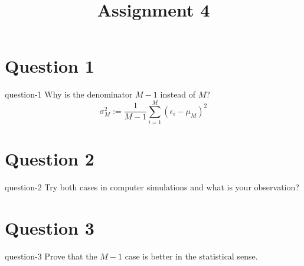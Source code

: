 \title{Assignment 4}


\section{Question 1}
\begin{statebox}{}{question-1}
    Why is the denominator $M-1$ instead of $M$?
    \[
    	\sigma_M^2 := \frac{1}{M-1}\sum_{i=1}^{M} (\epsilon_i-\mu_M)^2
    \]
\end{statebox}



\section{Question 2}
\begin{statebox}{}{question-2}
    Try both cases in computer simulations and what is your observation?
\end{statebox}



\section{Question 3}
\begin{statebox}{}{question-3}
    Prove that the $M-1$ case is better in the statistical sense.
\end{statebox}



% 
